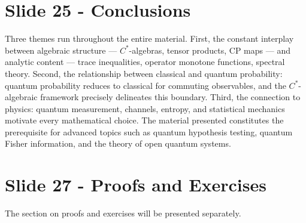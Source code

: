 \documentclass{article}
\begin{document}
\section*{Slide 25 - Conclusions}
Three themes run throughout the entire material. First, the constant interplay between algebraic structure — $C^*$-algebras, tensor products, CP maps — and analytic content — trace inequalities, operator monotone functions, spectral theory. Second, the relationship between classical and quantum probability: quantum probability reduces to classical for commuting observables, and the $C^*$-algebraic framework precisely delineates this boundary. Third, the connection to physics: quantum measurement, channels, entropy, and statistical mechanics motivate every mathematical choice. The material presented constitutes the prerequisite for advanced topics such as quantum hypothesis testing, quantum Fisher information, and the theory of open quantum systems.

\section*{Slide 27 - Proofs and Exercises}
The section on proofs and exercises will be presented separately. 
\end{document}
